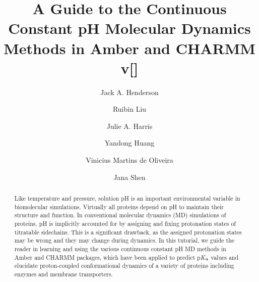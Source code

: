\documentclass[9pt,tutorial]{livecoms}
\title{A Guide to the Continuous Constant pH Molecular Dynamics 
Methods in Amber and CHARMM v[\versionnumber]}
\author[1,\authfn{1},\authfn{2}]{Jack A. Henderson}
\author[1,\authfn{1}]{Ruibin Liu}
\author[1,\authfn{3}]{Julie A. Harris}
\author[1,\authfn{4}]{Yandong Huang}
\author[1]{Vinicius Martins de Oliveira}
\author[1*]{Jana Shen}
\affil[1]{University of Maryland School of Pharmacy, Baltimore, MD}
\newcommand{\pka}{p\textit{K}$_{\rm a}$}
\begin{document}
\begin{frontmatter}
\maketitle

\begin{abstract}


Like temperature and pressure, solution pH is an important environmental variable in biomolecular simulations. 
Virtually all proteins depend on pH to maintain their structure and function. 
In conventional molecular dynamics (MD) simulations of proteins, pH is implicitly accounted for by assigning and fixing protonation states of titratable sidechains. This is a significant drawback, 
as the assigned protonation states may be wrong and they may change during dynamics.
In this tutorial, we guide the reader in learning and using the various continuous constant pH MD methods in Amber and CHARMM packages, which have been applied to predict {\pka} values and elucidate proton-coupled conformational dynamics of a variety of proteins including enzymes and membrane transporters.
\end{abstract}

\end{frontmatter}




\end{document}
